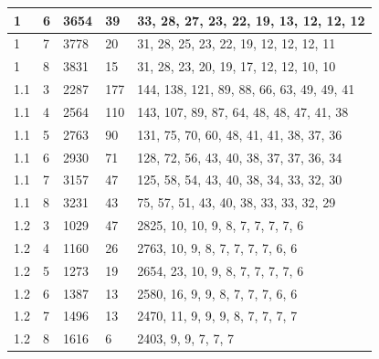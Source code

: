 \documentclass{VUMIFInfKursinis}
\begin{document}
\begin{table}[!ht]
\begin{tabular}{|l|l|l|l|l|}
\rowcolor[HTML]{EFEFEF} 
1          & 6            & 3654               & 39                        & 33, 28, 27, 23, 22, 19, 13, 12, 12, 12    \\ \hline
\rowcolor[HTML]{EFEFEF} 
1          & 7            & 3778               & 20                        & 31, 28, 25, 23, 22, 19, 12, 12, 12, 11    \\ \hline
\rowcolor[HTML]{EFEFEF} 
1          & 8            & 3831               & 15                        & 31, 28, 23, 20, 19, 17, 12, 12, 10, 10    \\ \hline
1.1        & 3            & 2287               & 177                       & 144, 138, 121, 89, 88, 66, 63, 49, 49, 41 \\ \hline
1.1        & 4            & 2564               & 110                       & 143, 107, 89, 87, 64, 48, 48, 47, 41, 38  \\ \hline
1.1        & 5            & 2763               & 90                        & 131, 75, 70, 60, 48, 41, 41, 38, 37, 36   \\ \hline
1.1        & 6            & 2930               & 71                        & 128, 72, 56, 43, 40, 38, 37, 37, 36, 34   \\ \hline
1.1        & 7            & 3157               & 47                        & 125, 58, 54, 43, 40, 38, 34, 33, 32, 30   \\ \hline
1.1        & 8            & 3231               & 43                        & 75, 57, 51, 43, 40, 38, 33, 33, 32, 29    \\ \hline
\rowcolor[HTML]{EFEFEF} 
1.2        & 3            & 1029               & 47                        & 2825, 10, 10, 9, 8, 7, 7, 7, 7, 6         \\ \hline
\rowcolor[HTML]{EFEFEF} 
1.2        & 4            & 1160               & 26                        & 2763, 10, 9, 8, 7, 7, 7, 7, 6, 6          \\ \hline
\rowcolor[HTML]{EFEFEF} 
1.2        & 5            & 1273               & 19                        & 2654, 23, 10, 9, 8, 7, 7, 7, 7, 6         \\ \hline
\rowcolor[HTML]{EFEFEF} 
1.2        & 6            & 1387               & 13                        & 2580, 16, 9, 9, 8, 7, 7, 7, 6, 6          \\ \hline
\rowcolor[HTML]{EFEFEF} 
1.2        & 7            & 1496               & 13                        & 2470, 11, 9, 9, 9, 8, 7, 7, 7, 7          \\ \hline
\rowcolor[HTML]{EFEFEF} 
1.2        & 8            & 1616               & 6                         & 2403, 9, 9, 7, 7, 7                       \\ \hline

\end{tabular}
\end{table}
\end{document}

